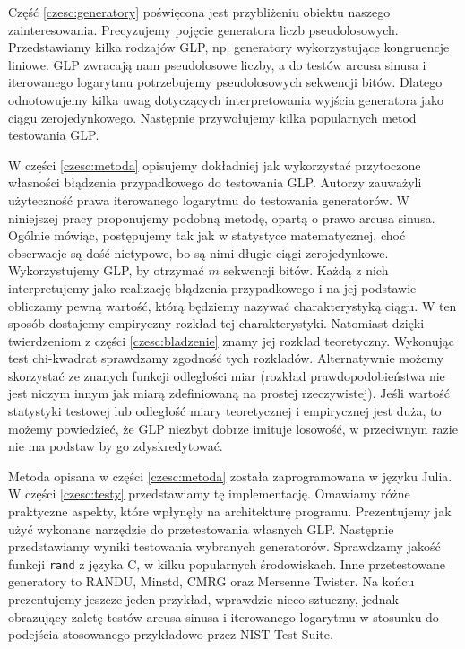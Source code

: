 \documentclass[a4paper,11pt,twoside]{book}
\theoremstyle{definition}
\begin{document}
Część \ref{czesc:generatory} poświęcona jest przybliżeniu obiektu naszego zainteresowania. Precyzujemy pojęcie generatora liczb pseudolosowych. Przedstawiamy kilka rodzajów GLP, np. generatory wykorzystujące kongruencje liniowe. GLP zwracają nam pseudolosowe liczby, a do testów arcusa sinusa i iterowanego logarytmu potrzebujemy pseudolosowych sekwencji bitów. Dlatego odnotowujemy kilka uwag dotyczących interpretowania wyjścia generatora jako ciągu zerojedynkowego. Następnie przywołujemy kilka popularnych metod testowania GLP.

W części \ref{czesc:metoda} opisujemy dokładniej jak wykorzystać przytoczone własności błądzenia przypadkowego do testowania GLP. Autorzy \cite{wang-nic} zauważyli użyteczność prawa iterowanego logarytmu do testowania generatorów. W niniejszej pracy proponujemy podobną metodę, opartą o prawo arcusa sinusa. Ogólnie mówiąc, postępujemy tak jak w statystyce matematycznej, choć obserwacje są dość nietypowe, bo są nimi długie ciągi zerojedynkowe. Wykorzystujemy GLP, by otrzymać $m$ sekwencji bitów. Każdą z nich interpretujemy jako realizację błądzenia przypadkowego i na jej podstawie obliczamy pewną wartość, którą będziemy nazywać charakterystyką ciągu. W ten sposób dostajemy empiryczny rozkład tej charakterystyki. Natomiast dzięki twierdzeniom z części \ref{czesc:bladzenie} znamy jej rozkład teoretyczny. Wykonując test chi-kwadrat sprawdzamy zgodność tych rozkładów. Alternatywnie możemy skorzystać ze znanych funkcji odległości miar (rozkład prawdopodobieństwa nie jest niczym innym jak miarą zdefiniowaną na prostej rzeczywistej). Jeśli wartość statystyki testowej lub odległość miary teoretycznej i empirycznej jest duża, to możemy powiedzieć, że GLP niezbyt dobrze imituje losowość, w przeciwnym razie nie ma podstaw by go zdyskredytować.

Metoda opisana w części \ref{czesc:metoda} została zaprogramowana w języku Julia. W części \ref{czesc:testy} przedstawiamy tę implementację. Omawiamy różne praktyczne aspekty, które wpłynęły na architekturę programu. Prezentujemy jak użyć wykonane narzędzie do przetestowania własnych GLP. Następnie przedstawiamy wyniki testowania wybranych generatorów. Sprawdzamy jakość funkcji \texttt{rand} z języka C, w kilku popularnych środowiskach. Inne przetestowane generatory to RANDU, Minstd, CMRG oraz Mersenne Twister. Na końcu prezentujemy jeszcze jeden przykład, wprawdzie nieco sztuczny, jednak obrazujący zaletę testów arcusa sinusa i iterowanego logarytmu w stosunku do podejścia stosowanego przykładowo przez NIST Test Suite.
\end{document}

